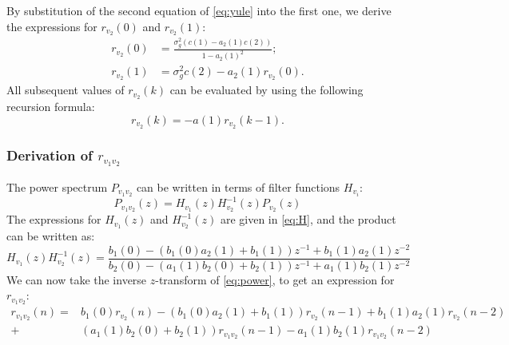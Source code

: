 \documentclass[12pt,a4paper]{article}
\begin{document}
By substitution of the second equation of \autoref{eq:yule} into the first one, we derive the expressions for $r_{v_2}(0)$ and $r_{v_2}(1)$:
\begin{align}\label{eq:rv2}
r_{v_2}(0) &= \frac{\sigma^2_{g}(c(1) - a_2(1)c(2))}{1-a_2(1)^2};\\
r_{v_2}(1) &= \sigma^2_{g}c(2) - a_2(1)r_{v_2}(0).
\end{align}
All subsequent values of $r_{v_2}(k)$ can be evaluated by using the following recursion formula:
\begin{equation}\label{eq:recursion}
r_{v_2}(k) = -a(1)r_{v_2}(k-1).
\end{equation}

\subsubsection*{Derivation of $r_{v_{1}v_{2}}$}
The power spectrum $P_{v_1v_2}$ can be written in terms of filter functions $H_{v_i}$:
\begin{equation}\label{eq:power}
P_{v_1v_2}(z) = H_{v_1}(z)H^{-1}_{v_2}(z)P_{v_2}(z)
\end{equation}
The expressions for $H_{v_1}(z)$ and $H^{-1}_{v_2}(z)$ are given in \autoref{eq:H}, and the product can be written as:
\begin{equation}\label{eq:HH-1}
H_{v_1}(z)H^{-1}_{v_2}(z) = \frac{b_1(0) - (b_1(0)a_2(1) + b_1(1))z^{-1} + b_1(1)a_2(1)z^{-2}}{b_2(0) - (a_1(1)b_2(0) + b_2(1))z^{-1} + a_1(1)b_2(1)z^{-2}}
\end{equation}
We can now take the inverse $z$-transform of \autoref{eq:power}, to get an expression for $r_{v_{1}v_{2}}$:
\begin{align*}\label{eq:rv1v2}
r_{v_{1}v_{2}}(n) = &b_1(0)r_{v_2}(n) - (b_1(0)a_2(1) + b_1(1))r_{v_2}(n-1) + b_1(1)a_2(1)r_{v_2}(n-2)\\
+ &(a_1(1)b_2(0) + b_2(1)) r_{v_{1}v_{2}}(n-1) - a_1(1)b_2(1)r_{v_{1}v_{2}}(n-2)
\end{align*}
\end{document}

